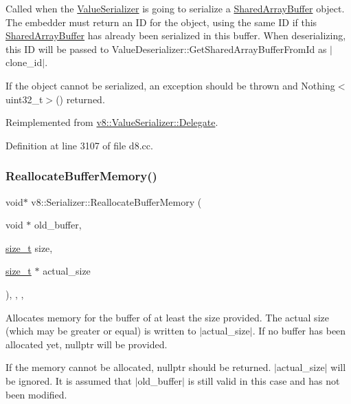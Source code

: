 Called when the \mbox{\hyperlink{classv8_1_1ValueSerializer}{Value\+Serializer}} is going to serialize a \mbox{\hyperlink{classv8_1_1SharedArrayBuffer}{Shared\+Array\+Buffer}} object. The embedder must return an ID for the object, using the same ID if this \mbox{\hyperlink{classv8_1_1SharedArrayBuffer}{Shared\+Array\+Buffer}} has already been serialized in this buffer. When deserializing, this ID will be passed to Value\+Deserializer\+::\+Get\+Shared\+Array\+Buffer\+From\+Id as $\vert$clone\+\_\+id$\vert$.

If the object cannot be serialized, an exception should be thrown and Nothing$<$uint32\+\_\+t$>$() returned. 

Reimplemented from \mbox{\hyperlink{classv8_1_1ValueSerializer_1_1Delegate_ac12b5cfd7480c19f0b9af0b47d05a77e}{v8\+::\+Value\+Serializer\+::\+Delegate}}.



Definition at line 3107 of file d8.\+cc.

\mbox{\label{classv8_1_1Serializer_a0642983ee43067669e17c87411167a02}} 
\subsubsection{\texorpdfstring{Reallocate\+Buffer\+Memory()}{ReallocateBufferMemory()}}
{\footnotesize\ttfamily void$\ast$ v8\+::\+Serializer\+::\+Reallocate\+Buffer\+Memory (\begin{DoxyParamCaption}\item[{void $\ast$}]{old\+\_\+buffer,  }\item[{\mbox{\hyperlink{classsize__t}{size\+\_\+t}}}]{size,  }\item[{\mbox{\hyperlink{classsize__t}{size\+\_\+t}} $\ast$}]{actual\+\_\+size }\end{DoxyParamCaption})\hspace{0.3cm}{\ttfamily [inline]}, {\ttfamily [override]}, {\ttfamily [protected]}, {\ttfamily [virtual]}}

Allocates memory for the buffer of at least the size provided. The actual size (which may be greater or equal) is written to $\vert$actual\+\_\+size$\vert$. If no buffer has been allocated yet, nullptr will be provided.

If the memory cannot be allocated, nullptr should be returned. $\vert$actual\+\_\+size$\vert$ will be ignored. It is assumed that $\vert$old\+\_\+buffer$\vert$ is still valid in this case and has not been modified.

